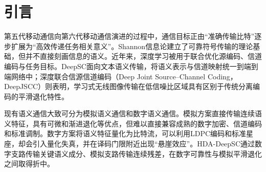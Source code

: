\documentclass[UTF8,a4paper,11pt]{ctexart}
\newcommand{\HDADeepSC}{HDA-DeepSC}
\newcommand{\LDPC}{LDPC}
\begin{document}
\begin{abstract}
Hybrid digital--analog semantic communication combines a digital branch for important semantic information with an analog branch for continuous residual information. This work reproduces an HDA-DeepSC image transmission system and extends its receiver to imperfect channel state information. Pilot-aided linear minimum mean square error channel estimation, controlled channel-estimation perturbations, and a differentiable noisy training surrogate are introduced. We first explain why conventional least-squares and robust linear minimum mean square error equalizers may become nearly equivalent after gain-aware soft demodulation: the equalization coefficient cancels when both the residual channel gain and filtered-noise variance are consistently included in the log-likelihood-ratio metric. A raw-domain uncertainty-aware maximum-a-posteriori soft demodulator is therefore developed while preserving the original adaptive modulation and coding table. Controlled experiments in the 16-QAM region show average absolute bit-error-rate reductions of 0.009557, 0.016187, and 0.022957 for channel-estimation normalized mean square error values of 0.1, 0.2, and 0.5, with corresponding average peak-signal-to-noise-ratio gains of 1.040, 1.445, and 1.058 dB. The evidence supports a modulation- and error-regime-dependent benefit rather than a universal gain across all transmission conditions.

\noindent\textbf{Keywords:} semantic communication; hybrid digital--analog transmission; imperfect channel state information; robust soft demodulation; maximum a posteriori detection; adaptive modulation and coding; Rician fading
\end{abstract}

\section{引言}
第五代移动通信向第六代移动通信演进的过程中，通信目标正由“准确传输比特”逐步扩展为“高效传递任务相关意义”。Shannon信息论建立了可靠符号传输的理论基础\cite{shannon1948}，但并不直接刻画信息的语义。近年来，深度学习被用于联合优化源编码、信道编码与任务目标。DeepSC面向文本语义传输，将语义表示与信道映射统一到端到端网络中\cite{xie2021deepsc}；深度联合信源信道编码（Deep Joint Source--Channel Coding，DeepJSCC）则表明，学习式无线图像传输在低信噪比区域具有区别于传统分离编码的平滑退化特性\cite{bourtsoulatze2019deepjscc}。

现有语义通信大致可分为模拟语义通信和数字语义通信。模拟方案直接传输连续语义特征，具有可微和渐进退化等优点，但难以直接兼容成熟的数字加密、信道编码和标准调制。数字方案将语义特征量化为比特流，可以利用\LDPC{}编码和标准星座，却会引入量化失真，并在译码门限附近出现“悬崖效应”。\HDADeepSC{}通过数字支路传输关键语义成分、模拟支路传输连续残差，在数字可靠性与模拟平滑退化之间取得折中\cite{xie2025hda}。
\end{document}
